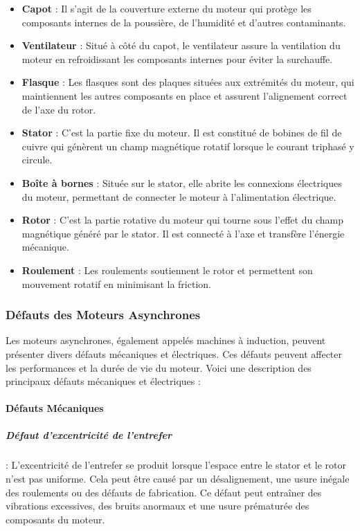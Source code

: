\begin{itemize}
	\item \textbf{Capot} : Il s'agit de la couverture externe du moteur qui protège les composants internes de la poussière, de l'humidité et d'autres contaminants.
	\item \textbf{Ventilateur} : Situé à côté du capot, le ventilateur assure la ventilation du moteur en refroidissant les composants internes pour éviter la surchauffe.
	\item \textbf{Flasque} : Les flasques sont des plaques situées aux extrémités du moteur, qui maintiennent les autres composants en place et assurent l'alignement correct de l'axe du rotor.
	\item \textbf{Stator} : C'est la partie fixe du moteur. Il est constitué de bobines de fil de cuivre qui génèrent un champ magnétique rotatif lorsque le courant triphasé y circule.
	\item \textbf{Boîte à bornes} : Située sur le stator, elle abrite les connexions électriques du moteur, permettant de connecter le moteur à l'alimentation électrique.
	\item \textbf{Rotor} : C'est la partie rotative du moteur qui tourne sous l'effet du champ magnétique généré par le stator. Il est connecté à l'axe et transfère l'énergie mécanique.
	\item \textbf{Roulement} : Les roulements soutiennent le rotor et permettent son mouvement rotatif en minimisant la friction.
\end{itemize}

\subsubsection{Défauts des Moteurs Asynchrones}

Les moteurs asynchrones, également appelés machines à induction, peuvent
présenter divers défauts mécaniques et électriques. Ces défauts peuvent
affecter les performances et la durée de vie du moteur. Voici une description
des principaux défauts mécaniques et électriques :

\paragraph{Défauts Mécaniques}

\subparagraph{Défaut d'excentricité de l'entrefer}:
L'excentricité de l'entrefer se produit lorsque l'espace entre le stator et le
rotor n'est pas uniforme. Cela peut être causé par un désalignement, une usure
inégale des roulements ou des défauts de fabrication. Ce défaut peut entraîner
des vibrations excessives, des bruits anormaux et une usure prématurée des
composants du moteur.

